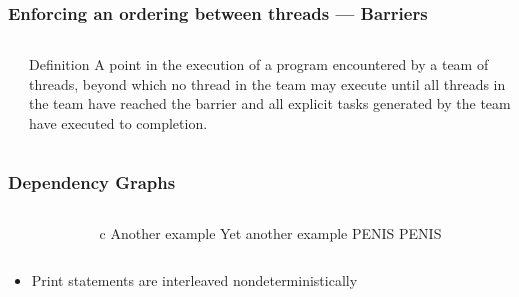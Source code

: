 \documentclass[handout]{beamer}
\begin{document}
\begin{frame}[fragile]
  \frametitle{Enforcing an ordering between threads --- Barriers}
  \begin{columns}[t]%
    \begin{column}{0.65\textwidth}
    \end{column}
    \pause
    \begin{column}{0.4\textwidth}
      \begin{block}{Definition}
      A point in the execution of a program encountered by a team of threads, beyond which no thread in the team may execute until all threads in the team have reached the barrier and all explicit tasks generated by the team have executed to completion. 
      \end{block}
    \end{column}
  \end{columns}
\end{frame}


\begin{frame}[fragile]
  \frametitle{Dependency Graphs}
  \begin{columns}[t]%
    \begin{column}{0.65\textwidth}
    \end{column}
    \pause
    \begin{column}{0.4\textwidth}
      \begin{ccode}[]
        {c}
        Another example
        Yet another example
        PENIS
        PENIS
      \end{ccode}
    \end{column}
  \end{columns}
  \pause
  \begin{itemize}
  \item Print statements are interleaved nondeterministically
  \end{itemize}
\end{frame}
\end{document}
